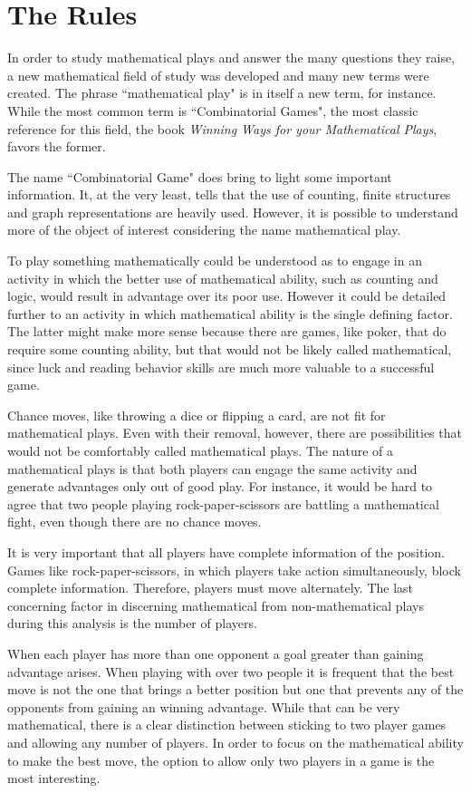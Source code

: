 \section*{The Rules}

In order to study mathematical plays and answer the many questions they raise, a new mathematical field of study was developed and many new terms were created. The phrase ``mathematical play" is in itself a new term, for instance. While the most common term is ``Combinatorial Games", the most classic reference for this field, the book \textit{Winning Ways for your Mathematical Plays}, favors the former.

The name ``Combinatorial Game" does bring to light some important information. It, at the very least, tells that the use of counting, finite structures and graph representations are heavily used. However, it is possible to understand more of the object of interest considering the name mathematical play.

To play something mathematically could be understood as to engage in an activity in which the better use of mathematical ability, such as counting and logic, would result in advantage over its poor use. However it could be detailed further to an activity in which mathematical ability is the single defining factor. The latter might make more sense because there are games, like poker, that do require some counting ability, but that would not be likely called mathematical, since luck and reading behavior skills are much more valuable to a successful game.

Chance moves, like throwing a dice or flipping a card, are not fit for mathematical plays. Even with their removal, however, there are possibilities that would not be comfortably called mathematical plays. The nature of a mathematical plays is that both players can engage the same activity and generate advantages only out of good play. For instance, it would be hard to agree that two people playing rock-paper-scissors are battling a mathematical fight, even though there are no chance moves.

It is very important that all players have complete information of the position. Games like rock-paper-scissors, in which players take action simultaneously, block complete information. Therefore, players must move alternately. The last concerning factor in discerning mathematical from non-mathematical plays during this analysis is the number of players.

When each player has more than one opponent a goal greater than gaining advantage arises. When playing with over two people it is frequent that the best move is not the one that brings a better position but one that prevents any of the opponents from gaining an winning advantage. While that can be very mathematical, there is a clear distinction between sticking to two player games and allowing any number of players. In order to focus on the mathematical ability to make the best move, the option to allow only two players in a game is the most interesting.

